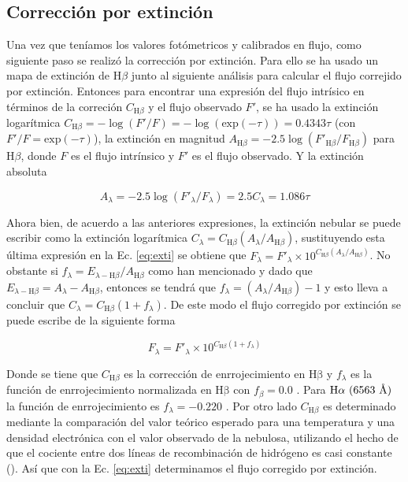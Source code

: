 \subsection{Corrección por extinción}
\label{sec:extintion}

Una vez que teníamos los valores fotómetricos y calibrados en flujo, como siguiente paso se realizó la corrección por extinción. Para ello se ha usado un mapa de extinción de \(\text{H}\beta\) junto al siguiente análisis para calcular el flujo correjido por extinción. Entonces para encontrar una expresión del flujo intrísico en términos de la correción \(C_{\text{H}\beta}\) y el flujo observado \(F'\), se ha usado la extinción logarítmica \(C_{\text{H}\beta} = -\log(F'/F) = -\log (\text{exp}(-\tau)) = 0.4343\tau\) (con \(F'/F = \text{exp}(-\tau)\)),  la extinción en magnitud \(A_{\text{H}\beta}=-2.5\log(F'_{\text{H}\beta}/F_{\text{H}\beta})\) para  \(\text{H}\beta\), donde  \(F\) es el flujo intrínsico y \(F'\) es el flujo observado. Y la extinción absoluta  

\begin{equation}
A_{\lambda}=-2.5\log(F'_{\lambda}/F_{\lambda})=2.5C_{\lambda}=1.086\tau
\label{eq:exti}
\end{equation}

Ahora bien, de acuerdo a las anteriores expresiones, la extinción nebular se puede escribir como la extinción logarítmica \(C_{\lambda} = C_{\text{H}\beta}(A_{\lambda}/A_{\text{H}\beta})\), sustituyendo esta última expresión en la Ec. \ref{eq:exti} se obtiene que  \(F_{\lambda} = F'_{\lambda}\times10^{C_{\text{H}\beta}(A_{\lambda}/A_{\text{H}\beta})}\). No obstante si  \(f_{\lambda}= E_{\lambda-\text{H}\beta}/A_{\text{H}\beta}\) como han mencionado \citet{Costero:1970} y dado que \(E_{\lambda-\text{H}\beta}=A_{\lambda}-A_{\text{H}\beta}\), entonces se tendrá que \(f_{\lambda} = (A_{\lambda}/A_{\text{H}\beta})-1\) y esto lleva a concluir que \(C_{\lambda}= C_{\text{H}\beta}(1+f_{\lambda})\). De este modo el flujo corregido por extinción se puede escribe de la siguiente forma

\begin{equation}
  \label{eq:flujo}
  F_{\lambda} = F'_{\lambda}\times10^{C_{\text{H}\beta}(1+f_{\lambda})}
\end{equation}

 Donde se tiene que \(C_{\text{H}\beta}\) es la corrección de enrrojecimiento en \(\mathrm{H\beta}\) y \(f_{\lambda}\) es la función de enrrojecimiento normalizada en \(\mathrm{H\beta}\) con \(f_{\beta}=0.0\) \citep{Peimbert:1977}. Para \(\mathrm{H}\alpha{}~(6563~\text{\AA{}}{})\) la función de enrrojecimiento es \(f_{\lambda} = -0.220\) \citep{Blagrave:2007}. Por otro lado \(C_{\text{H}\beta}\) es determinado mediante la comparación del valor teórico esperado para una temperatura y una densidad electrónica con el valor observado de la nebulosa, utilizando el hecho de que el cociente entre dos líneas de recombinación de hidrógeno es casi constante (\citeauthor{Peimbert:1977}). Así que con la Ec. \ref{eq:exti} determinamos el flujo corregido por extinción.

